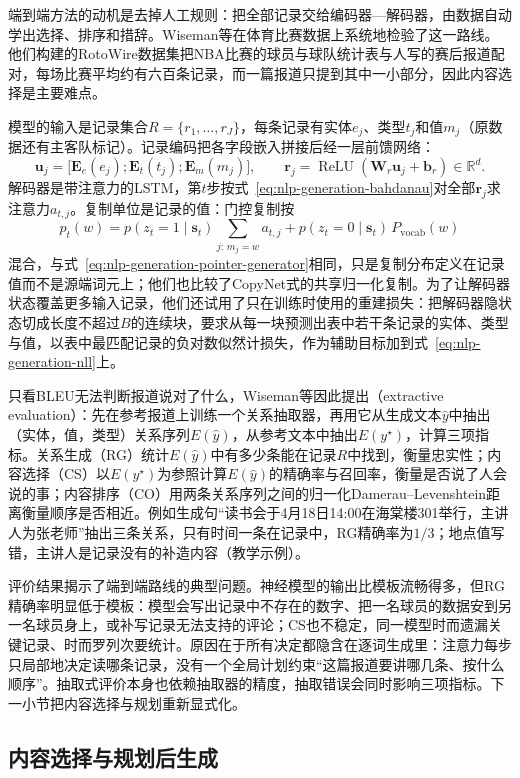 端到端方法的动机是去掉人工规则：把全部记录交给编码器—解码器，由数据自动学出选择、排序和措辞。Wiseman等在体育比赛数据上系统地检验了这一路线。他们构建的RotoWire数据集把NBA比赛的球员与球队统计表与人写的赛后报道配对，每场比赛平均约有六百条记录，而一篇报道只提到其中一小部分，因此内容选择是主要难点。

模型的输入是记录集合$R=\{r_1,\ldots,r_J\}$，每条记录有实体$e_j$、类型$t_j$和值$m_j$（原数据还有主客队标记）。记录编码把各字段嵌入拼接后经一层前馈网络：
\[
  \bm u_j=\bigl[\bm E_e(e_j);\bm E_t(t_j);\bm E_m(m_j)\bigr],\qquad
  \bm r_j=\operatorname{ReLU}(\bm W_r\bm u_j+\bm b_r)\in\mathbb R^{d}.
\]
解码器是带注意力的LSTM，第$t$步按式~\eqref{eq:nlp-generation-bahdanau}对全部$\bm r_j$求注意力$a_{t,j}$。复制单位是记录的值：门控复制按
\[
  p_t(w)=p(z_t=1\mid\bm s_t)\sum_{j:\,m_j=w}a_{t,j}+p(z_t=0\mid\bm s_t)\,P_{\mathrm{vocab}}(w)
\]
混合，与式~\eqref{eq:nlp-generation-pointer-generator}相同，只是复制分布定义在记录值而不是源端词元上；他们也比较了CopyNet式的共享归一化复制。为了让解码器状态覆盖更多输入记录，他们还试用了只在训练时使用的重建损失：把解码器隐状态切成长度不超过$B$的连续块，要求从每一块预测出表中若干条记录的实体、类型与值，以表中最匹配记录的负对数似然计损失，作为辅助目标加到式~\eqref{eq:nlp-generation-nll}上。

只看BLEU无法判断报道说对了什么，Wiseman等因此提出（extractive evaluation）：先在参考报道上训练一个关系抽取器，再用它从生成文本$\hat y$中抽出（实体，值，类型）关系序列$E(\hat y)$，从参考文本中抽出$E(y^{\star})$，计算三项指标。关系生成（RG）统计$E(\hat y)$中有多少条能在记录$R$中找到，衡量忠实性；内容选择（CS）以$E(y^{\star})$为参照计算$E(\hat y)$的精确率与召回率，衡量是否说了人会说的事；内容排序（CO）用两条关系序列之间的归一化Damerau--Levenshtein距离衡量顺序是否相近。例如生成句“读书会于4月18日14:00在海棠楼301举行，主讲人为张老师”抽出三条关系，只有时间一条在记录中，RG精确率为$1/3$；地点值写错，主讲人是记录没有的补造内容（教学示例）。

评价结果揭示了端到端路线的典型问题。神经模型的输出比模板流畅得多，但RG精确率明显低于模板：模型会写出记录中不存在的数字、把一名球员的数据安到另一名球员身上，或补写记录无法支持的评论；CS也不稳定，同一模型时而遗漏关键记录、时而罗列次要统计。原因在于所有决定都隐含在逐词生成里：注意力每步只局部地决定读哪条记录，没有一个全局计划约束“这篇报道要讲哪几条、按什么顺序”。抽取式评价本身也依赖抽取器的精度，抽取错误会同时影响三项指标。下一小节把内容选择与规划重新显式化。

\subsection{内容选择与规划后生成}
\label{sec:nlp-generation-content-planning}

